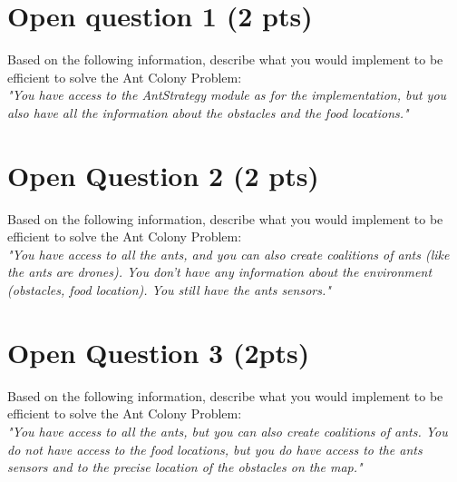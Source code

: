 \documentclass[11pt,a4paper]{report}
\begin{document}
\maketitle

\section{Open question 1 (2 pts)}
Based on the following information, describe what you would implement to be efficient to solve the Ant Colony Problem:\\

\noindent\textit{"You have access to the AntStrategy module as for the implementation, but you also have all the information about the obstacles and the food locations."}

\begin{answers}[12cm]
\end{answers}



\section{Open Question 2 (2 pts)}
Based on the following information, describe what you would implement to be efficient to solve the Ant Colony Problem:\\

\noindent\textit{"You have access to all the ants, and you can also create coalitions of ants (like the ants are drones). You don't have any information about the environment (obstacles, food location). You still have the ants sensors."}

\begin{answers}[12cm]
\end{answers}


\newpage
\section{Open Question 3 (2pts)}
Based on the following information, describe what you would implement to be efficient to solve the Ant Colony Problem:\\

\noindent\textit{"You have access to all the ants, but you can also create coalitions of ants. You do not have access to the food locations, but you do have access to the ants sensors and to the precise location of the obstacles on the map."}

\begin{answers}[12cm]
\end{answers}
\end{document}
